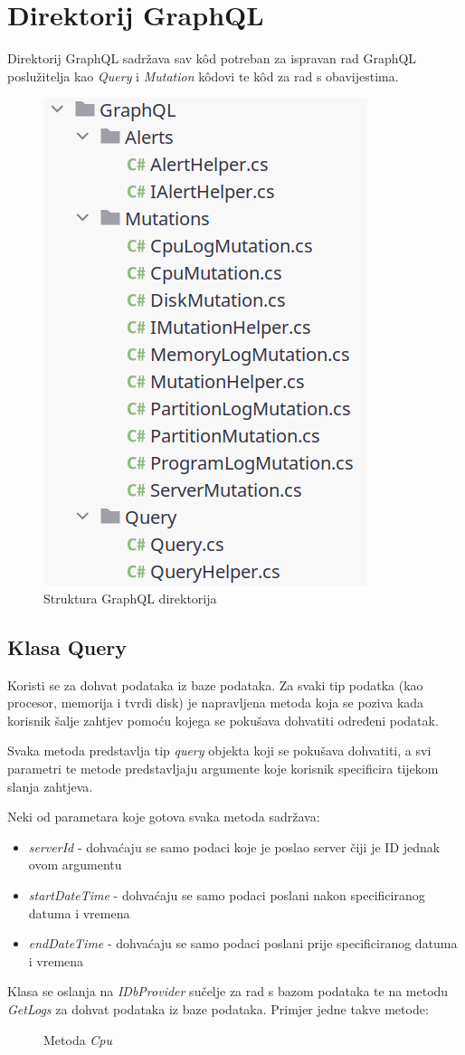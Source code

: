 \documentclass[zavrsnirad]{fer}
\begin{document}
\section{Direktorij GraphQL}
\label{pog:graphql_dir}
Direktorij GraphQL sadržava sav kôd potreban za ispravan rad GraphQL poslužitelja kao \textit{Query} i \textit{Mutation} kôdovi te kôd za rad s obavijestima.

\begin{figure}[htb!]
	\centering
	\includegraphics[width=0.4\linewidth]{images/graphql_dir_structure.png} 
	\caption{Struktura GraphQL direktorija}
\label{slk:graphql_dir_structure}
\end{figure}
\FloatBarrier

\subsection{Klasa Query}
\label{pog:query.cs}
Koristi se za dohvat podataka iz baze podataka. Za svaki tip podatka (kao procesor, memorija i tvrdi disk) je napravljena metoda koja se poziva kada korisnik šalje zahtjev pomoću kojega se pokušava dohvatiti određeni podatak.

Svaka metoda predstavlja tip \textit{query} objekta koji se pokušava dohvatiti, a svi parametri te metode predstavljaju argumente koje korisnik specificira tijekom slanja zahtjeva.

Neki od parametara koje gotova svaka metoda sadržava:
\begin{itemize}
	\item \textit{serverId} - dohvaćaju se samo podaci koje je poslao server čiji je ID jednak ovom argumentu
	\item \textit{startDateTime} - dohvaćaju se samo podaci poslani nakon specificiranog datuma i vremena
	\item \textit{endDateTime} - dohvaćaju se samo podaci poslani prije specificiranog datuma i vremena
\end{itemize}
Klasa se oslanja na \textit{IDbProvider} sučelje za rad s bazom podataka te na metodu \textit{GetLogs} za dohvat podataka iz baze podataka. Primjer jedne takve metode:
\begin{figure}[htb]
	\centering
	
	\caption{Metoda \textit{Cpu}}
\end{figure}
\FloatBarrier
\end{document}
